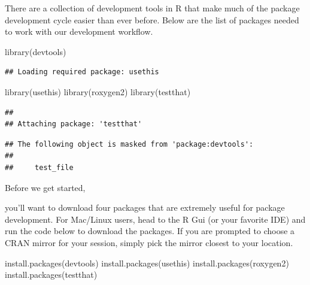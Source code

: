 \documentclass[
]{book}
\newenvironment{Shaded}{\begin{snugshade}}{\end{snugshade}}
\newcommand{\FunctionTok}[1]{\textcolor[rgb]{0.00,0.00,0.00}{#1}}
\newcommand{\NormalTok}[1]{#1}
\newcommand{\StringTok}[1]{\textcolor[rgb]{0.31,0.60,0.02}{#1}}
\begin{document}
There are a collection of development tools in R that make much of the package development cycle easier than ever before. Below are the list of packages needed to work with our development workflow.

\begin{Shaded}
\begin{Highlighting}[]
\FunctionTok{library}\NormalTok{(}\StringTok{\textquotesingle{}devtools\textquotesingle{}}\NormalTok{)}
\end{Highlighting}
\end{Shaded}

\begin{verbatim}
## Loading required package: usethis
\end{verbatim}

\begin{Shaded}
\begin{Highlighting}[]
\FunctionTok{library}\NormalTok{(}\StringTok{\textquotesingle{}usethis\textquotesingle{}}\NormalTok{)}
\FunctionTok{library}\NormalTok{(}\StringTok{\textquotesingle{}roxygen2\textquotesingle{}}\NormalTok{)}
\FunctionTok{library}\NormalTok{(}\StringTok{\textquotesingle{}testthat\textquotesingle{}}\NormalTok{)}
\end{Highlighting}
\end{Shaded}

\begin{verbatim}
## 
## Attaching package: 'testthat'
\end{verbatim}

\begin{verbatim}
## The following object is masked from 'package:devtools':
## 
##     test_file
\end{verbatim}

Before we get started,

you'll want to download four packages that are extremely useful for package development. For Mac/Linux users, head to the R Gui (or your favorite IDE) and run the code below to download the packages. If you are prompted to choose a CRAN mirror for your session, simply pick the mirror closest to your location.

\begin{Shaded}
\begin{Highlighting}[]
\FunctionTok{install.packages}\NormalTok{(}\StringTok{\textquotesingle{}devtools\textquotesingle{}}\NormalTok{)}
\FunctionTok{install.packages}\NormalTok{(}\StringTok{\textquotesingle{}usethis\textquotesingle{}}\NormalTok{)}
\FunctionTok{install.packages}\NormalTok{(}\StringTok{\textquotesingle{}roxygen2\textquotesingle{}}\NormalTok{)}
\FunctionTok{install.packages}\NormalTok{(}\StringTok{\textquotesingle{}testthat\textquotesingle{}}\NormalTok{)}
\end{Highlighting}
\end{Shaded}
\end{document}
